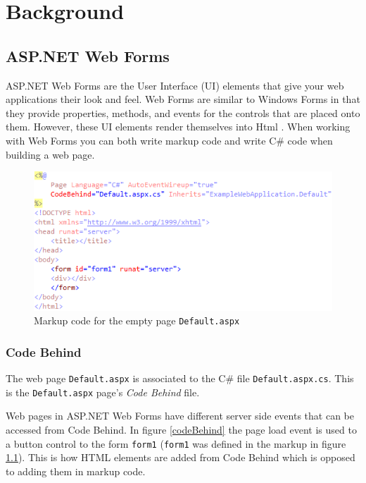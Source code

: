 \chapter{Background}

\section{ASP.NET Web Forms} %
\label{sec:asp_net_web_forms}
	ASP.NET Web Forms are the User Interface (UI) elements that give your web applications their look and feel. Web Forms are similar to Windows Forms \cite{msdn01} in that they provide properties, methods, and events for the controls that are placed onto them. However, these UI elements render themselves into Html \cite{msdn02}. When working with Web Forms you can both write markup code and write C\# code when building a web page. 

	\begin{figure}[H]
					\includegraphics[width=12cm]{resources/images/Markup.png}
				\caption{Markup code for the empty page \texttt{Default.aspx}}
				\label{markup}
			\end{figure}

	\subsection{Code Behind} %
	\label{sub:code_behind}
		The web page \texttt{Default.aspx} is associated to the C\# file \texttt{Default.aspx.cs}. This is the \texttt{Default.aspx} page's \emph{Code Behind} file. 

		Web pages in ASP.NET Web Forms have different server side events that can be accessed from Code Behind. In figure \ref{codeBehind} the page load event is used to a button control to the form \texttt{form1} (\texttt{form1} was defined in the markup in figure \ref{markup}). This is how HTML elements are added from Code Behind which is opposed to adding them in markup code.


